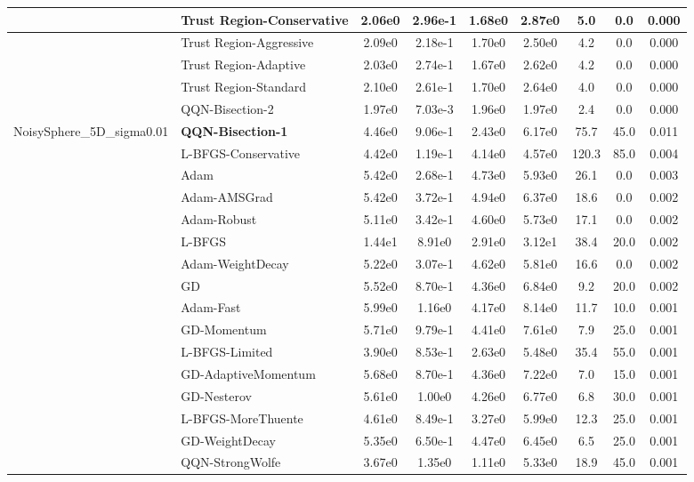 \documentclass{article}
\begin{document}
\begin{longtable}{|l|l|c|c|c|c|c|c|c|}
\hline
 & Trust Region-Conservative & 2.06e0 & 2.96e-1 & 1.68e0 & 2.87e0 & 5.0 & 0.0 & 0.000 \\
\hline
 & Trust Region-Aggressive & 2.09e0 & 2.18e-1 & 1.70e0 & 2.50e0 & 4.2 & 0.0 & 0.000 \\
\hline
 & Trust Region-Adaptive & 2.03e0 & 2.74e-1 & 1.67e0 & 2.62e0 & 4.2 & 0.0 & 0.000 \\
\hline
 & Trust Region-Standard & 2.10e0 & 2.61e-1 & 1.70e0 & 2.64e0 & 4.0 & 0.0 & 0.000 \\
\hline
 & QQN-Bisection-2 & 1.97e0 & 7.03e-3 & 1.96e0 & 1.97e0 & 2.4 & 0.0 & 0.000 \\
NoisySphere\_5D\_sigma0.01 & \textbf{QQN-Bisection-1} & 4.46e0 & 9.06e-1 & 2.43e0 & 6.17e0 & 75.7 & 45.0 & 0.011 \\
\hline
 & L-BFGS-Conservative & 4.42e0 & 1.19e-1 & 4.14e0 & 4.57e0 & 120.3 & 85.0 & 0.004 \\
\hline
 & Adam & 5.42e0 & 2.68e-1 & 4.73e0 & 5.93e0 & 26.1 & 0.0 & 0.003 \\
\hline
 & Adam-AMSGrad & 5.42e0 & 3.72e-1 & 4.94e0 & 6.37e0 & 18.6 & 0.0 & 0.002 \\
\hline
 & Adam-Robust & 5.11e0 & 3.42e-1 & 4.60e0 & 5.73e0 & 17.1 & 0.0 & 0.002 \\
\hline
 & L-BFGS & 1.44e1 & 8.91e0 & 2.91e0 & 3.12e1 & 38.4 & 20.0 & 0.002 \\
\hline
 & Adam-WeightDecay & 5.22e0 & 3.07e-1 & 4.62e0 & 5.81e0 & 16.6 & 0.0 & 0.002 \\
\hline
 & GD & 5.52e0 & 8.70e-1 & 4.36e0 & 6.84e0 & 9.2 & 20.0 & 0.002 \\
\hline
 & Adam-Fast & 5.99e0 & 1.16e0 & 4.17e0 & 8.14e0 & 11.7 & 10.0 & 0.001 \\
\hline
 & GD-Momentum & 5.71e0 & 9.79e-1 & 4.41e0 & 7.61e0 & 7.9 & 25.0 & 0.001 \\
\hline
 & L-BFGS-Limited & 3.90e0 & 8.53e-1 & 2.63e0 & 5.48e0 & 35.4 & 55.0 & 0.001 \\
\hline
 & GD-AdaptiveMomentum & 5.68e0 & 8.70e-1 & 4.36e0 & 7.22e0 & 7.0 & 15.0 & 0.001 \\
\hline
 & GD-Nesterov & 5.61e0 & 1.00e0 & 4.26e0 & 6.77e0 & 6.8 & 30.0 & 0.001 \\
\hline
 & L-BFGS-MoreThuente & 4.61e0 & 8.49e-1 & 3.27e0 & 5.99e0 & 12.3 & 25.0 & 0.001 \\
\hline
 & GD-WeightDecay & 5.35e0 & 6.50e-1 & 4.47e0 & 6.45e0 & 6.5 & 25.0 & 0.001 \\
\hline
 & QQN-StrongWolfe & 3.67e0 & 1.35e0 & 1.11e0 & 5.33e0 & 18.9 & 45.0 & 0.001 \\

\end{longtable}
\end{document}
